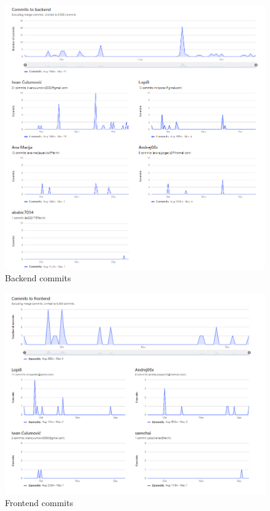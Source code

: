 		\begin{figure}[H]
			\includegraphics[scale=0.50]{slike/backend.png} %
			\centering
			\caption{Backend commits}
			\label{BC}
		\end{figure}
	
		\begin{figure}[H]
			\includegraphics[scale=0.50]{slike/frontend.png} %
			\centering
			\caption{Frontend commits}
			\label{FN}
		\end{figure}
	
